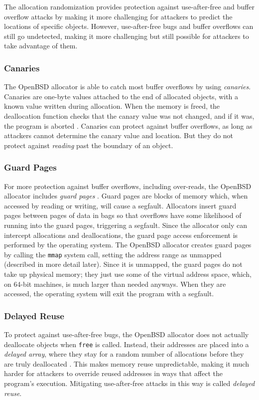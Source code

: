 \documentclass[conference]{IEEEtran}
\begin{document}
The allocation randomization provides protection against use-after-free and buffer overflow attacks by making it more challenging for attackers to predict the locations of specific objects.
However, use-after-free bugs and buffer overflows can still go undetected, making it more challenging but still possible for attackers to take advantage of them.

\subsubsection{Canaries}
The OpenBSD allocator is able to catch most buffer overflows by using \emph{canaries}.
Canaries are one-byte values attached to the end of allocated objects, with a known value written during allocation.
When the memory is freed, the deallocation function checks that the canary value was not changed, and if it was, the program is aborted \cite{openbsd_man_page}.
Canaries can protect against buffer overflows, as long as attackers cannot determine the canary value and location.
But they do not protect against \emph{reading} past the boundary of an object.

\subsubsection{Guard Pages}
For more protection against buffer overflows, including over-reads, the OpenBSD allocator includes \emph{guard pages} \cite{openbsd_man_page}.
Guard pages are blocks of memory which, when accessed by reading or writing, will cause a segfault.
Allocators insert guard pages between pages of data in bags so that overflows have some likelihood of running into the guard pages, triggering a segfault.
Since the allocator only can intercept allocations and deallocations, the guard page access enforcement is performed by the operating system.
The OpenBSD allocator creates guard pages by calling the \verb|mmap| system call, setting the address range as unmapped (described in more detail later).
Since it is unmapped, the guard pages do not take up physical memory; they just use some of the virtual address space, which, on 64-bit machines, is much larger than needed anyways.
When they are accessed, the operating system will exit the program with a segfault.

\subsubsection{Delayed Reuse}
To protect against use-after-free bugs, the OpenBSD allocator does not actually deallocate objects when \verb|free| is called.
Instead, their addresses are placed into a \emph{delayed array}, where they stay for a random number of allocations before they are truly deallocated \cite{freeguard}.
This makes memory reuse unpredictable, making it much harder for attackers to override reused addresses in ways that affect the program's execution.
Mitigating use-after-free attacks in this way is called \emph{delayed reuse}.
\end{document}
